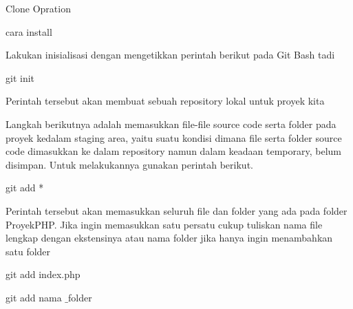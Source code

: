 
\sloppy
{\fontsize{18pt}{18pt}\selectfont Clone Opration \\} \par
\vspace{14pt}
\noindent 
{\fontsize{16pt}{16pt}\selectfont cara install \\} \par
\vspace{16pt}
\noindent 
{\fontsize{14pt}{14pt}\selectfont Lakukan inisialisasi dengan mengetikkan perintah berikut pada Git Bash tadi \\} \par
\vspace{14pt}
\noindent 
{\fontsize{14pt}{14pt}\selectfont git init \\} \par
\vspace{14pt}
\noindent 
{\fontsize{14pt}{14pt}\selectfont Perintah tersebut akan membuat sebuah repository lokal untuk proyek kita \\} \par
\vspace{14pt}
\noindent 
{\fontsize{14pt}{14pt}\selectfont Langkah berikutnya adalah memasukkan file-file source code serta folder pada proyek kedalam staging area, yaitu suatu kondisi dimana file serta folder source code dimasukkan ke dalam repository namun dalam keadaan temporary, belum disimpan. Untuk melakukannya gunakan perintah berikut. \\} \par
\vspace{14pt}
\noindent 
{\fontsize{14pt}{14pt}\selectfont git add * \\} \par
\vspace{14pt}
\noindent 
{\fontsize{14pt}{14pt}\selectfont Perintah tersebut akan memasukkan seluruh file dan folder yang ada pada folder ProyekPHP. Jika ingin memasukkan satu persatu cukup tuliskan nama file lengkap dengan ekstensinya atau nama folder jika hanya ingin menambahkan satu folder \\} \par
\vspace{14pt}
\noindent 
{\fontsize{14pt}{14pt}\selectfont git add index.php \\} \par
\vspace{14pt}
\noindent 
{\fontsize{14pt}{14pt}\selectfont git add nama $  \_  $folder \\} \par
\vspace{14pt}
